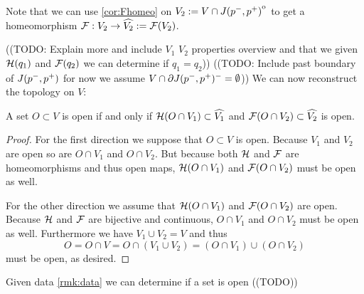 \begin{remark}
    Note that we can use \ref{cor:Fhomeo} on $V_2:=V\cap {\kern0ptJ(p^-,p^+)}^{\mathrm{o}}$ to get a homeomorphism $\mathcal{F}:V_2\to \widehat{V_2}:=\mathcal{F}(V_2)$. 
\end{remark}
((TODO: Explain more and include $V_1$ $V_2$ properties overview and that we given ${\mathcal{H}}(q_1)$ and $\mathcal{F}(q_2)$ we can determine if $q_1=q_2$))
((TODO: Include past boundary of $J(p^-,p^+)$ for now we assume $V\cap \partial J(p^-,p^+)^-=\emptyset$))
We can now reconstruct the topology on $V$:
\begin{proposition}
    A set $O\subset V$ is open if and only if ${\mathcal{H}}(O\cap V_1)\subset \widehat{V_1}$ and $\mathcal{F}(O\cap V_2)\subset \widehat{V_2}$ is open.
\end{proposition}
\begin{proof}
    For the first direction we suppose that $O\subset V$ is open. Because $V_1$ and $V_2$ are open so are $O\cap V_1$ and $O\cap V_2$. But because both ${\mathcal{H}}$ and $\mathcal{F}$ are homeomorphisms and thus open maps, ${\mathcal{H}}(O\cap V_1)$ and ${\mathcal{F}}(O\cap V_2)$ must be open as well.

    For the other direction we assume that ${\mathcal{H}}(O\cap V_1)$ and ${\mathcal{F}}(O\cap V_2)$ are open. Because ${\mathcal{H}}$ and ${\mathcal{F}}$ are bijective and continuous, $O\cap V_1$ and $O\cap V_2$ must be open as well. Furthermore we have $V_1\cup V_2 = V$ and thus 
    \[
        O = O\cap V = O \cap (V_1\cup V_2) = (O\cap V_1) \cup (O\cap V_2)
    \] must be open, as desired.
\end{proof}

\begin{corollary}
    Given data \ref{rmk:data} we can determine if a set is open ((TODO))
\end{corollary}